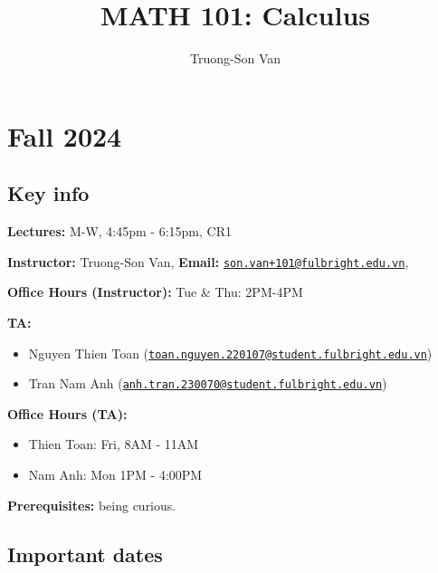 \documentclass[
]{article}
\title{MATH 101: Calculus}
\author{Truong-Son Van}
\date{}
\begin{document}
\maketitle

{
\setcounter{tocdepth}{2}
\tableofcontents
}
\section*{Fall 2024}\label{fall-2024}

\subsection*{Key info}\label{key-info}

\textbf{Lectures:} M-W, 4:45pm - 6:15pm, CR1

\textbf{Instructor:} Truong-Son Van, \textbf{Email:} \href{mailto:son.van+101@fulbright.edu.vn}{\nolinkurl{son.van+101@fulbright.edu.vn}},

\textbf{Office Hours (Instructor):} Tue \& Thu: 2PM-4PM

\textbf{TA:}

\begin{itemize}
\item
  Nguyen Thien Toan (\href{mailto:toan.nguyen.220107@student.fulbright.edu.vn}{\nolinkurl{toan.nguyen.220107@student.fulbright.edu.vn}})
\item
  Tran Nam Anh (\href{mailto:anh.tran.230070@student.fulbright.edu.vn}{\nolinkurl{anh.tran.230070@student.fulbright.edu.vn}})
\end{itemize}

\textbf{Office Hours (TA):}

\begin{itemize}
\item
  Thien Toan: Fri, 8AM - 11AM
\item
  Nam Anh: Mon 1PM - 4:00PM
\end{itemize}

\textbf{Prerequisites:} being curious.

\subsection*{Important dates}\label{important-dates}
\end{document}
